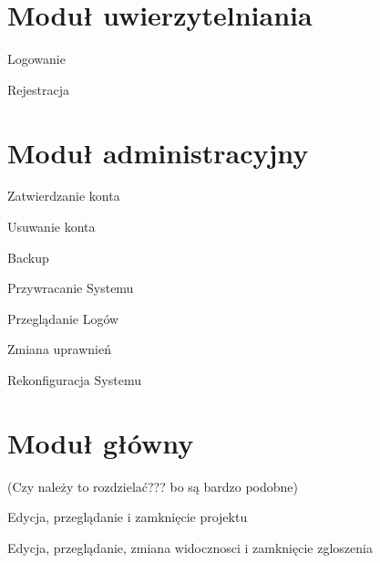 \section{Moduł uwierzytelniania}

\begin{class}{Logowanie}
\end{class}

\begin{class}{Rejestracja}
\end{class}

\section{Moduł administracyjny}

\begin{class}{Zatwierdzanie konta}
\end{class}

\begin{class}{Usuwanie konta}
\end{class}

\begin{class}{Backup}
\end{class}

\begin{class}{Przywracanie Systemu}
\end{class}

\begin{class}{Przeglądanie Logów}
\end{class}

\begin{class}{Zmiana uprawnień}
\end{class}

\begin{class}{Rekonfiguracja Systemu}
\end{class}

\section{Moduł główny}
(Czy należy to rozdzielać??? bo są bardzo podobne)\todo
\begin{class}{Edycja, przeglądanie i zamknięcie projektu}
\end{class}

\begin{class}{Edycja, przeglądanie, zmiana widocznosci i zamknięcie zgloszenia}
\end{class}



